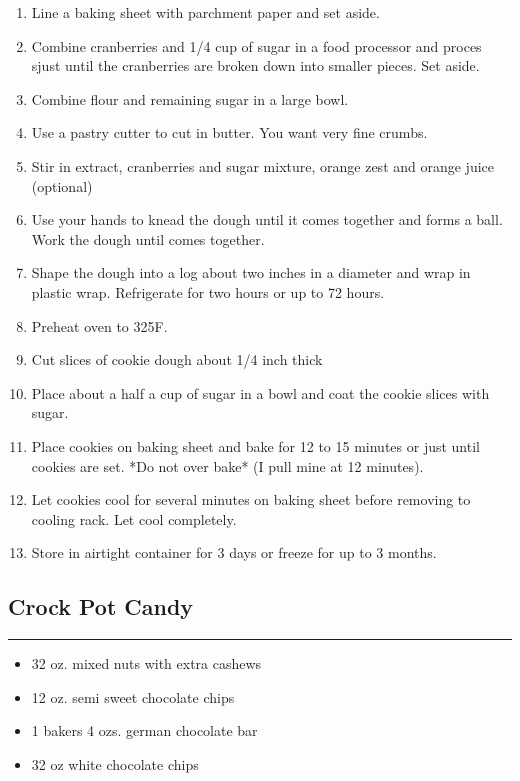 \documentclass{article}
\begin{document}
\begin{enumerate}
    \item  
        Line a baking sheet with parchment paper and set aside.
    \item 
        Combine cranberries and 1/4 cup of sugar in a food processor and proces sjust until the cranberries are broken down into smaller pieces. Set aside.
    \item  
        Combine flour and remaining sugar in a large bowl.
    \item 
        Use a pastry cutter to cut in butter. You want very fine crumbs.
    \item 
        Stir in extract, cranberries and sugar mixture, orange zest and orange juice (optional)
    \item  
        Use your hands to knead the dough until it comes together and forms a ball. Work the dough until comes together.
    \item  
        Shape the dough into a log about two inches in a diameter and wrap in plastic wrap. Refrigerate for two hours or up to 72 hours.
    \item 
        Preheat oven to 325F.
    \item  
        Cut slices of cookie dough about 1/4 inch thick
    \item  
        Place about a half a cup of sugar in a bowl and coat the cookie slices with sugar.
    \item  
        Place cookies on baking sheet and bake for 12 to 15 minutes or just until cookies are set. *Do not over bake* (I pull mine at 12 minutes).
    \item 
        Let cookies cool for several minutes on baking sheet before removing to cooling rack. Let cool completely.
    \item  
        Store in airtight container for 3 days or freeze for up to 3 months.
\end{enumerate}
\newpage

\subsection{Crock Pot Candy} 
\noindent\rule[0.5ex]{\linewidth}{1pt}

\begin{framed}
    \begin{itemize}
        \item 32 oz. mixed nuts with extra cashews 
        \item 12 oz. semi sweet chocolate chips 
        \item 1 bakers 4 ozs. german chocolate bar
        \item 32 oz white chocolate chips
    \end{itemize}
\end{framed}
\end{document}
